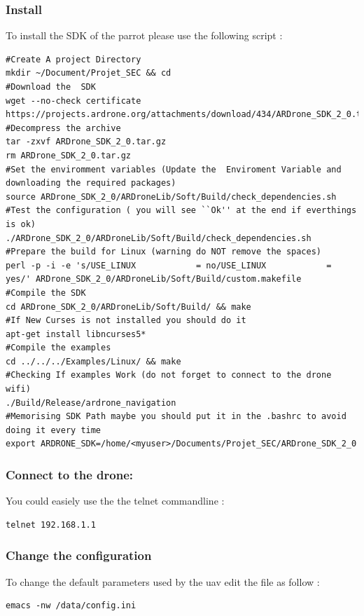 \subsubsection{Install}
To install the SDK of the parrot please use the following script :
\begin{lstlisting}
#Create A project Directory
mkdir ~/Document/Projet_SEC && cd 
#Download the  SDK
wget --no-check certificate https://projects.ardrone.org/attachments/download/434/ARDrone_SDK_2_0.tar.gz
#Decompress the archive
tar -zxvf ARDrone_SDK_2_0.tar.gz
rm ARDrone_SDK_2_0.tar.gz
#Set the enviromment variables (Update the  Enviroment Variable and downloading the required packages)
source ARDrone_SDK_2_0/ARDroneLib/Soft/Build/check_dependencies.sh
#Test the configuration ( you will see ``Ok'' at the end if everthings is ok)
./ARDrone_SDK_2_0/ARDroneLib/Soft/Build/check_dependencies.sh
#Prepare the build for Linux (warning do NOT remove the spaces)
perl -p -i -e 's/USE_LINUX            = no/USE_LINUX            = yes/' ARDrone_SDK_2_0/ARDroneLib/Soft/Build/custom.makefile
#Compile the SDK
cd ARDrone_SDK_2_0/ARDroneLib/Soft/Build/ && make
#If New Curses is not installed you should do it
apt-get install libncurses5*
#Compile the examples
cd ../../../Examples/Linux/ && make
#Checking If examples Work (do not forget to connect to the drone wifi)
./Build/Release/ardrone_navigation
#Memorising SDK Path maybe you should put it in the .bashrc to avoid doing it every time
export ARDRONE_SDK=/home/<myuser>/Documents/Projet_SEC/ARDrone_SDK_2_0
\end{lstlisting}
\subsubsection{Connect to the drone:}
You could easiely use the the telnet commandline :
\begin{lstlisting}
telnet 192.168.1.1
\end{lstlisting}
\subsubsection{Change the configuration}
To change the default parameters used by the uav edit the file as follow :
\begin{lstlisting}
emacs -nw /data/config.ini
\end{lstlisting}

